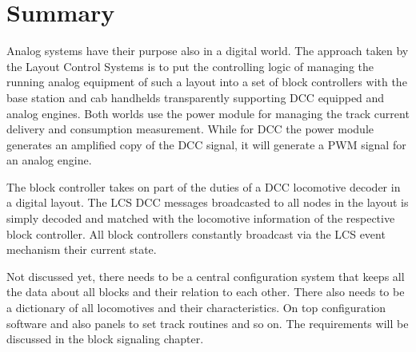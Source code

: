 \section{Summary}

Analog systems have their purpose also in a digital world. The approach taken by the Layout Control Systems is to put the controlling logic of managing the running analog equipment of such a layout into a set of block controllers with the base station and cab handhelds transparently supporting DCC equipped and analog engines. Both worlds use the power module for managing the track current delivery and consumption measurement. While for DCC the power module generates an amplified copy of the DCC signal, it will generate a PWM signal for an analog engine.

The block controller takes on part of the duties of a DCC locomotive decoder in a digital layout. The LCS DCC messages broadcasted to all nodes in the layout is simply decoded and matched with the locomotive information of the respective block controller. All block controllers constantly broadcast via the LCS event mechanism their current state.

Not discussed yet, there needs to be a central configuration system that keeps all the data about all blocks and their relation to each other. There also needs to be a dictionary of all locomotives and their characteristics. On top configuration software and also panels to set track routines and so on. The requirements will be discussed in the block signaling chapter.
